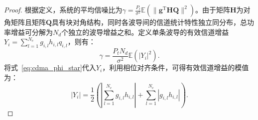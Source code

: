 \begin{proof}
	根据定义，系统的平均信噪比为$\gamma = \frac{P_{t}}{\sigma^2}\mathbb{E}\left(\|\bm{g}^\mathrm{T} \bm{HQ}\|^2\right)$。由于矩阵$\bm{H}$为对角矩阵且矩阵$\bm{Q}$具有块对角结构，同时各波导间的信道统计特性独立同分布，总功率增益可分解为$N_d$个独立的波导增益之和。定义单条波导的有效信道增益$Y_i = \sum_{l=1}^{N_e} g_{i,l} h_{i,l} q_{i,l}$，则有：
	\begin{equation}
		\gamma = \frac{P_{t} N_d}{\sigma^2} \mathbb{E}\left( |Y_i|^2 \right).
	\end{equation}
	将式~\eqref{eq:cdma_phi_star}代入$Y_i$，利用相位对齐条件，可得有效信道增益的模值为：
	\begin{equation}
		|Y_i| = \frac{1}{2} \left( \left| \sum_{l=1}^{N_e} g_{i,l} h_{i,l} \right| + \sum_{l=1}^{N_e} |g_{i,l} h_{i,l}| \right).
	\end{equation}
	

\end{proof}
